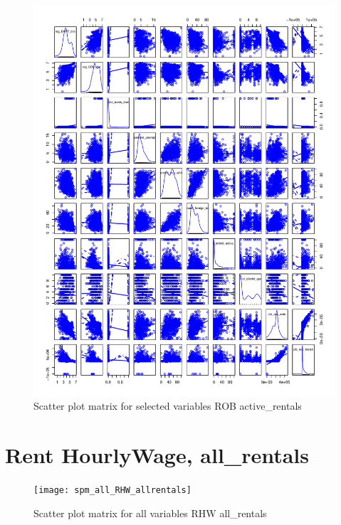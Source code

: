 \documentclass[10pt, letterpaper]{amsart}
\begin{document}
\begin{figure}[H]
  \caption{Scatter plot matrix for selected variables ROB active\_rentals}
  \includegraphics[scale=0.6]{spm_selected_ROB_activerentals}
\end{figure}


\newpage
\section{Rent HourlyWage, all\_rentals}

\begin{figure}[H]
  \caption{Scatter plot matrix for all variables RHW all\_rentals}
  \texttt{[image: spm\_all\_RHW\_allrentals]}
\end{figure}
\end{document}
